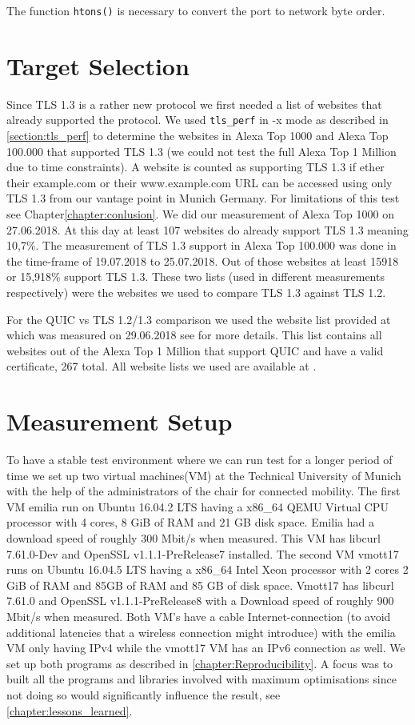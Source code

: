The function \texttt{htons()} is necessary to convert the port to network byte order.

\section{Target Selection}
\label{section:target_selection}
Since TLS 1.3 is a rather new protocol we first needed a list of websites that already supported the protocol.
We used  \texttt{tls\_perf} in -x mode as described in \ref{section:tls_perf} to determine the websites in Alexa Top 1000
and Alexa Top 100.000 that supported TLS 1.3 (we could not test the full Alexa Top 1 Million due to time constraints).
A website is counted as supporting TLS 1.3 if ether their example.com or their www.example.com URL can be accessed using only TLS 1.3 from our vantage point in Munich Germany.
For limitations of this test see Chapter\ref{chapter:conlusion}.
We did our measurement of Alexa Top 1000 on 27.06.2018. At this day at least 107 websites do already support TLS 1.3 meaning 10,7\%.
The measurement of TLS 1.3 support in Alexa Top 100.000 was done in the time-frame of 19.07.2018 to 25.07.2018.
Out of those websites at least 15918 or 15,918\% support TLS 1.3.
These two lists (used in different measurements respectively) were the websites we used to compare TLS 1.3 against TLS 1.2.


For the QUIC vs TLS 1.2/1.3 comparison we used the website list provided at \cite{Link:QUICsupport} which was measured on 29.06.2018 see \cite{DBLP:conf/pam/RuthPDH18} for more details.
This list contains all websites out of the Alexa Top 1 Million that support QUIC and have a valid certificate, 267 total.
All website lists we used are available at \cite{Link:WebsiteLists}.


\section{Measurement Setup}
\label{section:measurement_setup}

To have a stable test environment where we can run test for a longer period of time we set up two virtual machines(VM) at the Technical University of Munich with the help of the administrators of the chair for connected mobility.
The first VM emilia run on  Ubuntu 16.04.2 LTS having a x86\_64 QEMU Virtual CPU processor with 4 cores,  8 GiB of RAM and 21 GB disk space.
Emilia had a download speed of roughly 300 Mbit/s when measured.
This VM has libcurl 7.61.0-Dev and OpenSSL v1.1.1-PreRelease7 installed.
The second VM vmott17 runs on Ubuntu 16.04.5 LTS having a x86\_64 Intel Xeon processor with 2 cores 2 GiB of RAM and 85GB of RAM and 85 GB of disk space.
Vmott17 has libcurl 7.61.0 and OpenSSL v1.1.1-PreRelease8 with a Download speed of roughly 900 Mbit/s when measured.
Both VM's have a cable Internet-connection (to avoid additional latencies that a wireless connection might introduce) with the emilia VM only having IPv4 while the vmott17 VM has an IPv6 connection as well.
We set up both programs as described in \ref{chapter:Reproducibility}. A focus was to built all the programs and libraries involved with maximum optimisations since not doing so would significantly influence the result, see \ref{chapter:lessons_learned}.

